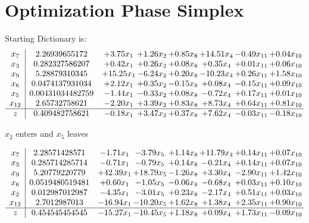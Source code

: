 \documentclass[9pt]{article}
\begin{document}
\section{Optimization Phase Simplex}
Starting Dictionary is:
\[\begin{array}{c| c c@{\hskip 2pt} c@{\hskip 2pt} c@{\hskip 2pt} c@{\hskip 2pt} c@{\hskip 2pt} c@{\hskip 2pt} }
 x_{7}   &  2.26939655172 & +  3.75 x_{1} & +  1.26 x_{2} & +  0.85 x_{8} & + 14.51 x_{4} & -0.49 x_{11} & +  0.04 x_{10}\\
 x_{3}   &  0.282327586207 & +  0.42 x_{1} & +  0.26 x_{2} & +  0.08 x_{8} & +  0.35 x_{4} & +  0.01 x_{11} & +  0.06 x_{10}\\
 x_{9}   &  5.28879310345 & + 15.25 x_{1} & -6.24 x_{2} & +  0.20 x_{8} & -10.23 x_{4} & +  0.26 x_{11} & +  1.58 x_{10}\\
 x_{6}   &  0.0474137931034 & +  2.12 x_{1} & +  0.35 x_{2} & -0.15 x_{8} & +  0.08 x_{4} & -0.15 x_{11} & +  0.09 x_{10}\\
 x_{5}   &  0.00431034482759 & -1.44 x_{1} & -0.33 x_{2} & +  0.08 x_{8} & -0.72 x_{4} & +  0.17 x_{11} & +  0.01 x_{10}\\
 x_{12}   &  2.65732758621 & -2.20 x_{1} & +  3.39 x_{2} & +  0.83 x_{8} & +  8.73 x_{4} & +  0.64 x_{11} & +  0.81 x_{10}\\
\hline
z    &  0.409482758621 & -0.18 x_{1} & +  3.47 x_{2} & +  0.37 x_{8} & +  7.62 x_{4} & -0.03 x_{11} & -0.18 x_{10}\\
\end{array}\]


 $ x_{2} $ enters and $ x_{5} $ leaves 

 \[\begin{array}{c| c c@{\hskip 2pt} c@{\hskip 2pt} c@{\hskip 2pt} c@{\hskip 2pt} c@{\hskip 2pt} c@{\hskip 2pt} }
 x_{7}   &  2.28571428571 & -1.71 x_{1} & -3.79 x_{5} & +  1.14 x_{8} & + 11.79 x_{4} & +  0.14 x_{11} & +  0.07 x_{10}\\
 x_{3}   &  0.285714285714 & -0.71 x_{1} & -0.79 x_{5} & +  0.14 x_{8} & -0.21 x_{4} & +  0.14 x_{11} & +  0.07 x_{10}\\
 x_{9}   &  5.20779220779 & + 42.39 x_{1} & + 18.79 x_{5} & -1.26 x_{8} & +  3.30 x_{4} & -2.90 x_{11} & +  1.42 x_{10}\\
 x_{6}   &  0.0519480519481 & +  0.60 x_{1} & -1.05 x_{5} & -0.06 x_{8} & -0.68 x_{4} & +  0.03 x_{11} & +  0.10 x_{10}\\
 x_{2}   &  0.012987012987 & -4.35 x_{1} & -3.01 x_{5} & +  0.23 x_{8} & -2.17 x_{4} & +  0.51 x_{11} & +  0.03 x_{10}\\
 x_{12}   &  2.7012987013 & -16.94 x_{1} & -10.20 x_{5} & +  1.62 x_{8} & +  1.38 x_{4} & +  2.35 x_{11} & +  0.90 x_{10}\\
\hline
z    &  0.454545454545 & -15.27 x_{1} & -10.45 x_{5} & +  1.18 x_{8} & +  0.09 x_{4} & +  1.73 x_{11} & -0.09 x_{10}\\
\end{array}\]
\end{document}
